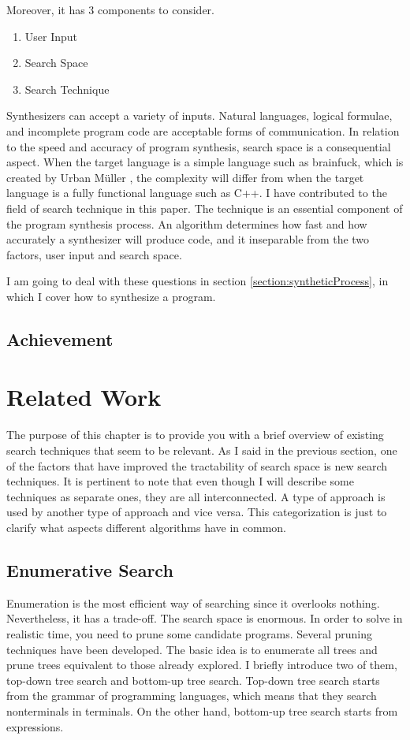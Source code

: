 \documentclass[12pt, a4paper, titlepage]{report}
\begin{document}
    Moreover, it has 3 components to consider.
    \begin{enumerate}
      \item User Input
      \item Search Space
      \item Search Technique
    \end{enumerate}
    Synthesizers can accept a variety of inputs.
    Natural languages, logical formulae, and incomplete program code are acceptable forms of communication.
    In relation to the speed and accuracy of program synthesis, search space is a consequential aspect.
    When the target language is a simple language such as brainfuck, which is created by Urban Müller \cite{easter:2020}, the complexity will differ from when the target language is a fully functional language such as C++.
    I have contributed to the field of search technique in this paper.
    The technique is an essential component of the program synthesis process.
    An algorithm determines how fast and how accurately a synthesizer will produce code, and it inseparable from the two factors, user input and search space.

    I am going to deal with these questions in section \ref{section:syntheticProcess}, in which I cover how to synthesize a program.

  \section{Achievement} %

\chapter{Related Work}\label{chapter:relatedWork}
  The purpose of this chapter is to provide you with a brief overview of existing search techniques that seem to be relevant. As I said in the previous section, one of the factors that have improved the tractability of search space is new search techniques.
  It is pertinent to note that even though I will describe some techniques as separate ones, they are all interconnected. A type of approach is used by another type of approach and vice versa. This categorization is just to clarify what aspects different algorithms have in common.

  \section{Enumerative Search}
  Enumeration is the most efficient way of searching since it overlooks nothing. Nevertheless, it has a trade-off. The search space is enormous. In order to solve in realistic time, you need to prune some candidate programs. Several pruning techniques have been developed. The basic idea is to enumerate all trees and prune trees equivalent to those already explored. I briefly introduce two of them, top-down tree search and bottom-up tree search.
  Top-down tree search starts from the grammar of programming languages, which means that they search nonterminals in terminals. On the other hand, bottom-up tree search starts from expressions.
\end{document}
